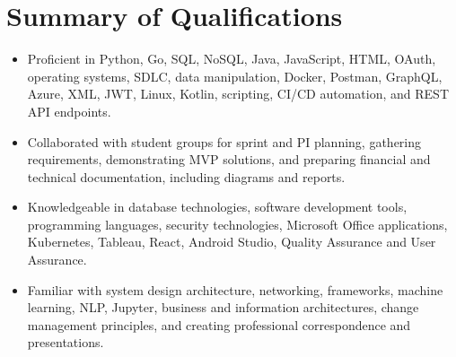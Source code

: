 \documentclass[letterpaper,10pt]{article}
\newcommand{\resumeItem}[1]{
  \item\small{
    {#1 \vspace{-2pt}}
  }
}
\newcommand{\resumeItemListStart}{\begin{itemize}}
\newcommand{\resumeItemListEnd}{\end{itemize}\vspace{-4pt}}
\begin{document}
\section{Summary of Qualifications}
 \begin{itemize}[leftmargin=0.0in, label={}]
\resumeItemListStart
    \resumeItem{Proficient in Python, Go, SQL, NoSQL, Java, JavaScript, HTML, OAuth, operating systems, SDLC, data manipulation, Docker, Postman, GraphQL, Azure, XML, JWT, Linux, Kotlin, scripting, CI/CD automation, and REST API endpoints.}
    
    \resumeItem{Collaborated with student groups for sprint and PI planning, gathering requirements, demonstrating MVP solutions, and preparing financial and technical documentation, including diagrams and reports.}
    
    \resumeItem{Knowledgeable in database technologies, software development tools, programming languages, security technologies, Microsoft Office applications, Kubernetes, Tableau, React, Android Studio, Quality Assurance and User Assurance.}
    
    \resumeItem{Familiar with system design architecture, networking, frameworks, machine learning, NLP, Jupyter, business and information architectures, change management principles, and creating professional correspondence and presentations.}
\resumeItemListEnd
 \end{itemize}
\end{document}
